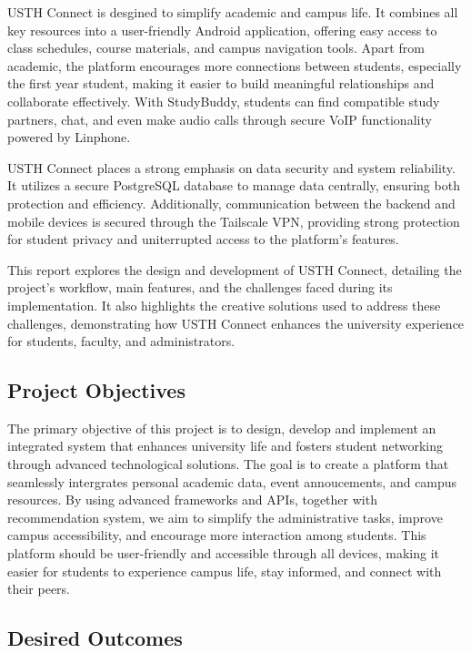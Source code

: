 \documentclass{article}
\begin{document}
USTH Connect is desgined to simplify academic and campus life. It combines all key resources into a user-friendly Android application, offering easy access to class schedules, course materials, and campus navigation tools.
Apart from academic, the platform encourages more connections between students, especially the first year student, making it easier to build meaningful relationships and collaborate effectively. 
With StudyBuddy, students can find compatible study partners, chat, and even make audio calls through secure VoIP functionality powered by Linphone.

USTH Connect places a strong emphasis on data security and system reliability. It utilizes a secure PostgreSQL database to manage data centrally, ensuring both protection and efficiency.
Additionally, communication between the backend and mobile devices is secured through the Tailscale VPN, providing strong protection for student privacy and uniterrupted access to the platform's features.

This report explores the design and development of USTH Connect, detailing the project's workflow, main features, and the challenges faced during its implementation. 
It also highlights the creative solutions used to address these challenges, demonstrating how USTH Connect enhances the university experience for students, faculty, and administrators.

\subsection{Project Objectives}
The primary objective of this project is to design, develop and implement an integrated system that enhances
university life and fosters student networking through advanced technological solutions.
The goal is to create a platform that seamlessly intergrates personal academic data, event annoucements, and campus resources.
By using advanced frameworks and APIs, together with recommendation system, we aim to simplify the administrative tasks, improve campus accessibility, 
and encourage more interaction among students.
This platform should be user-friendly and accessible through all devices, making it easier for students to experience campus life, 
stay informed, and connect with their peers. 

\subsection{Desired Outcomes}
\end{document}
